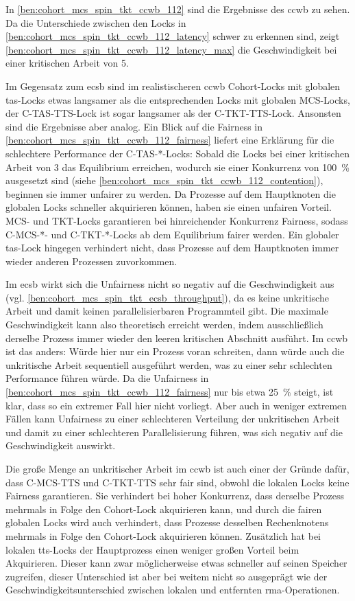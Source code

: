 In \autoref{ben:cohort_mcs_spin_tkt_ccwb_112} sind die Ergebnisse des \gls{ccwb} zu sehen.
Da die Unterschiede zwischen den Locks in \autoref{ben:cohort_mcs_spin_tkt_ccwb_112_latency} schwer zu erkennen sind,
zeigt \autoref{ben:cohort_mcs_spin_tkt_ccwb_112_latency_max} die Geschwindigkeit bei einer kritischen Arbeit von 5.

Im Gegensatz zum \gls{ecsb} sind im realistischeren \gls{ccwb}
Cohort-Locks mit globalen \gls{tas}-Locks etwas langsamer
als die entsprechenden Locks mit globalen MCS-Locks,
der C-TAS-TTS-Lock ist sogar langsamer
als der C-TKT-TTS-Lock.
Ansonsten sind die Ergebnisse aber analog.
Ein Blick auf die Fairness in \autoref{ben:cohort_mcs_spin_tkt_ccwb_112_fairness} liefert eine Erklärung
für die schlechtere Performance der C-TAS-*-Locks:
Sobald die Locks bei einer kritischen Arbeit von 3 das Equilibrium erreichen,
wodurch sie einer Konkurrenz von 100~\% ausgesetzt sind (siehe \autoref{ben:cohort_mcs_spin_tkt_ccwb_112_contention}),
beginnen sie immer unfairer zu werden.
Da Prozesse auf dem Hauptknoten die globalen Locks schneller akquirieren können,
haben sie einen unfairen Vorteil.
MCS- und TKT-Locks garantieren bei hinreichender Konkurrenz Fairness,
sodass C-MCS-*- und C-TKT-*-Locks ab dem Equilibrium fairer werden.
Ein globaler \gls{tas}-Lock hingegen verhindert nicht,
dass Prozesse auf dem Hauptknoten immer wieder anderen Prozessen zuvorkommen.

Im \gls{ecsb} wirkt sich die Unfairness nicht so negativ auf die Geschwindigkeit aus
(vgl. \autoref{ben:cohort_mcs_spin_tkt_ecsb_throughput}),
da es keine unkritische Arbeit
und damit keinen parallelisierbaren Programmteil gibt.
Die maximale Geschwindigkeit kann also theoretisch erreicht werden,
indem ausschließlich derselbe Prozess immer wieder den leeren kritischen Abschnitt ausführt.
Im \gls{ccwb} ist das anders:
Würde hier nur ein Prozess voran schreiten,
dann würde auch die unkritische Arbeit sequentiell ausgeführt werden,
was zu einer sehr schlechten Performance führen würde.
Da die Unfairness in \autoref{ben:cohort_mcs_spin_tkt_ccwb_112_fairness} nur bis etwa 25~\% steigt,
ist klar,
dass so ein extremer Fall hier nicht vorliegt.
Aber auch in weniger extremen Fällen kann Unfairness
zu einer schlechteren Verteilung der unkritischen Arbeit
und damit zu einer schlechteren Parallelisierung führen,
was sich negativ auf die Geschwindigkeit auswirkt.

Die große Menge an unkritischer Arbeit im \gls{ccwb} ist auch einer der Gründe dafür,
dass C-MCS-TTS und C-TKT-TTS sehr fair sind,
obwohl die lokalen Locks keine Fairness garantieren.
Sie verhindert bei hoher Konkurrenz,
dass derselbe Prozess mehrmals in Folge den Cohort-Lock akquirieren kann,
und durch die fairen globalen Locks wird auch verhindert,
dass Prozesse desselben Rechenknotens mehrmals in Folge den Cohort-Lock akquirieren können.
Zusätzlich hat bei lokalen \gls{tts}-Locks der Hauptprozess einen weniger großen Vorteil beim Akquirieren.
Dieser kann zwar möglicherweise etwas schneller auf seinen Speicher zugreifen,
dieser Unterschied ist aber bei weitem nicht so ausgeprägt
wie der Geschwindigkeitsunterschied zwischen lokalen und entfernten \gls{rma}-Operationen.

